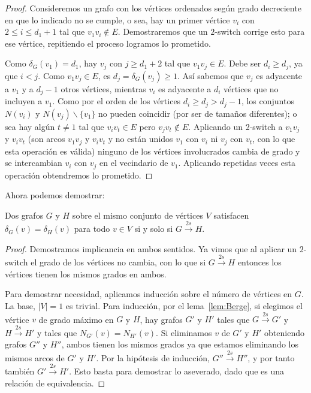   \begin{proof}
    Consideremos un grafo
    con los vértices ordenados según grado decreciente
    en que lo indicado no se cumple,
    o sea,
    hay un primer vértice \(v_i\) con \(2 \le i \le d_1 + 1\)
    tal que \(v_1 v_i \notin E\).
    Demostraremos que un \(2\)\nobreakdash-switch
    corrige esto para ese vértice,
    repitiendo el proceso logramos lo prometido.

    Como \(\delta_G(v_1) = d_1\),
    hay \(v_j\) con \(j \ge d_1 + 2\) tal que \(v_1 v_j \in E\).
    Debe ser \(d_i \ge d_j\),
    ya que \(i < j\).
    Como \(v_1 v_j \in E\),
    es \(d_j = \delta_G(v_j) \ge 1\).
    Así sabemos que \(v_j\)
    es adyacente a \(v_1\) y a \(d_j - 1\) otros vértices,
    mientras \(v_i\) es adyacente a \(d_i\) vértices
    que no incluyen a \(v_1\).
    Como por el orden de los vértices \(d_i \ge d_j > d_j - 1\),
    los conjuntos \(N(v_i)\) y \(N(v_j) \smallsetminus \{v_1\}\)
    no pueden coincidir
    (por ser de tamaños diferentes);
    o sea hay algún \(t \ne 1\)
    tal que \(v_i v_t \in E\) pero \(v_j v_t \notin E\).
    Aplicando un 2\nobreakdash-switch a \(v_1 v_j\) y \(v_i v_t\)
    (son arcos \(v_1 v_j\) y \(v_i v_t\)
     y no están unidos \(v_1\) con \(v_i\) ni \(v_j\) con \(v_t\),
     con lo que esta operación es válida)
    ninguno de los vértices involucrados cambia de grado
    y se intercambian \(v_i\) con \(v_j\) en el vecindario de \(v_1\).
    Aplicando repetidas veces
    esta operación obtendremos lo prometido.
  \end{proof}
  Ahora podemos demostrar:
  \begin{theorem}[Berge, 1973]
    \label{theo:Berge}
    Dos grafos \(G\) y \(H\)
    sobre el mismo conjunto de vértices \(V\)
    satisfacen \(\delta_G(v) = \delta_H(v)\) para todo \(v \in V\)
    si y solo si \(G \stackrel{2s}{\longrightarrow} H\).
  \end{theorem}
  \begin{proof}
    Demostramos implicancia en ambos sentidos.
    Ya vimos que al aplicar un \(2\)\nobreakdash-switch
    el grado de los vértices no cambia,
    con lo que si \(G \stackrel{2s}{\longrightarrow} H\)
    entonces los vértices tienen los mismos grados en ambos.

    Para demostrar necesidad,
    aplicamos inducción sobre el número de vértices en \(G\).%
    La base,
    \(\lvert V \rvert = 1\) es trivial.
    Para inducción,
    por el lema~\ref{lem:Berge},
    si elegimos el vértice \(v\) de grado máximo en \(G\) y \(H\),
    hay grafos \(G'\) y \(H'\) tales que
    \(G \stackrel{2s}{\longrightarrow} G'\)
    y \(H \stackrel{2s}{\longrightarrow} H'\)
    y tales que \(N_{G'}(v) = N_{H'}(v)\).
    Si eliminamos \(v\) de \(G'\) y \(H'\)
    obteniendo grafos \(G''\) y \(H''\),
    ambos tienen los mismos grados
    ya que estamos eliminando los mismos arcos de \(G'\) y \(H'\).
    Por la hipótesis de inducción,
    \(G'' \stackrel{2s}{\longrightarrow} H''\),
    y por tanto también \(G' \stackrel{2s}{\longrightarrow} H'\).
    Esto basta para demostrar lo aseverado,
    dado que es una relación de equivalencia.
  \end{proof}

